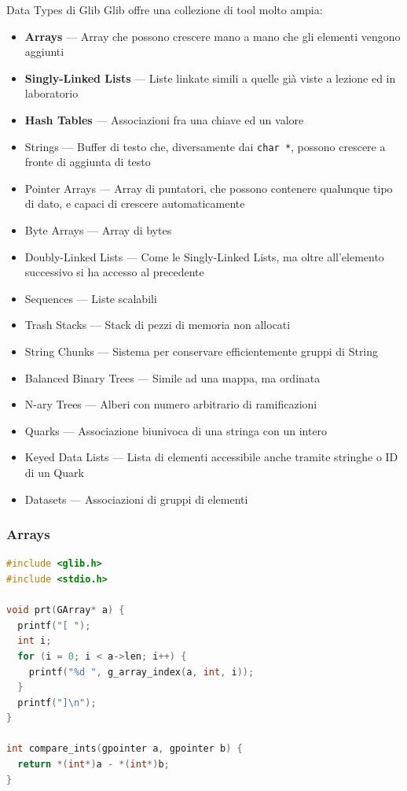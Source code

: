 \documentclass{beamer}
\begin{document}
\begin{frame}{Data Types di Glib}
Glib offre una collezione di tool molto ampia:
\begin{itemize}
 \item \textbf{Arrays} --- Array che possono crescere mano a mano che gli elementi vengono aggiunti
 \item \textbf{Singly-Linked Lists} --- Liste linkate simili a quelle già viste a lezione ed in laboratorio
 \item \textbf{Hash Tables} --- Associazioni fra una chiave ed un valore
\end{itemize}
\begin{itemize}
\scriptsize
 \item Strings --- Buffer di testo che, diversamente dai \texttt{char *}, possono crescere a fronte di aggiunta di testo
 \item Pointer Arrays --- Array di puntatori, che possono contenere qualunque tipo di dato, e capaci di crescere automaticamente
 \item Byte Arrays --- Array di bytes
 \item Doubly-Linked Lists --- Come le Singly-Linked Lists, ma oltre all'elemento successivo si ha accesso al precedente
 \item Sequences --- Liste scalabili
 \item Trash Stacks --- Stack di pezzi di memoria non allocati
 \item String Chunks --- Sistema per conservare efficientemente gruppi di String
 \item Balanced Binary Trees --- Simile ad una mappa, ma ordinata
 \item N-ary Trees --- Alberi con numero arbitrario di ramificazioni
 \item Quarks --- Associazione biunivoca di una stringa con un intero
 \item Keyed Data Lists --- Lista di elementi accessibile anche tramite stringhe o ID di un Quark
 \item Datasets --- Associazioni di gruppi di elementi
\end{itemize}
\end{frame}

\begin{frame}[fragile]
\frametitle{Arrays}
\begin{lstlisting}[language=C]
#include <glib.h>
#include <stdio.h>

void prt(GArray* a) {
  printf("[ ");
  int i;
  for (i = 0; i < a->len; i++) {
    printf("%d ", g_array_index(a, int, i));
  }
  printf("]\n");
}

int compare_ints(gpointer a, gpointer b) {
  return *(int*)a - *(int*)b;
}
\end{lstlisting}
\end{frame}
\end{document}
